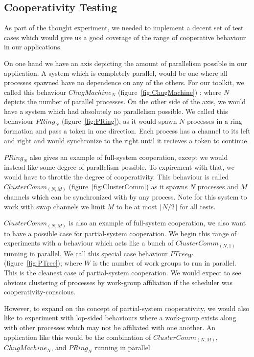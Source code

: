\subsection{Cooperativity Testing}\label{sec:cooperativity testing}

As part of the thought experiment, we needed to implement a decent set of test 
cases which would give us a good coverage of the range of cooperative behaviour
in our applications. 

On one hand we have an axis depicting the amount of parallelism possible in our 
application. A system which is completely parallel, would be one where all 
processes spawned have no dependence on any of the others. For our toolkit, we 
called this behaviour $ChugMachine_N$ (figure~\ref{fig:ChugMachine}) ; where $N$ depicts the number of parallel 
processes. On the other side of the axis, we would have a system which had 
absolutely no parallelism possible. We called this behaviour $PRing_N$ (figure~\ref{fig:PRing}), as it
would spawn $N$ processes in a ring formation and pass a token in one direction.
Each process has a channel to its left and right and would synchronize to the 
right until it recieves a token to continue. 

$PRing_N$ also gives an example of full-system cooperation, except we would 
instead like some degree of parallelism possible. To expirement with that, we 
would have to throttle the degree of cooperativity. This behaviour is called
$ClusterComm_{(N,M)}$ (figure~\ref{fig:ClusterComm}) as it spawns $N$ processes and $M$ channels which can be
synchronized with by any process. Note for this system to work with swap 
channels we limit $M$ to be at most $\lfloor N/2 \rfloor$ for all tests. 

$ClusterComm_{(N,M)}$ is also an example of full-system cooperation, we also
want to have a possible case for partial-system cooperation. We begin this range
of experiments with a behaviour which acts like a bunch of $ClusterComm_{(N,1)}$
running in parallel. We call this special case behaviour $PTree_W$ (figure~\ref{fig:PTree}); where $W$ is 
the number of work groups to run in parallel. This is the cleanest case of 
partial-system cooperation. We would expect to see obvious clustering of 
processes by work-group affiliation if the scheduler was 
cooperativity-conscious.

However, to expand on the concept of partial-system cooperativity, we would 
also like to experiment with lop-sided behaviours where a work-group exists 
along with other processes which may not be affiliated with one another. An 
application like this would be the combination of $ClusterComm_{(N,M)}$, 
$ChugMachine_N$, and $PRing_N$ running in parallel.

